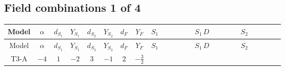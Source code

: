 \documentclass[8pt]{article}
\begin{document}
\begin{landscape}
\subsection*{Field combinations 1 of 4}
\begin{longtable}{@{}cccccccc >{\raggedright\arraybackslash}p{0.21\linewidth} >{\raggedright\arraybackslash}p{0.21\linewidth} >{\raggedright\arraybackslash}p{0.21\linewidth}@{}}
\toprule
Model & $\alpha$ & $d_{S_1}$ & $Y_{S_1}$ & $d_{S_2}$ & $Y_{S_2}$ & $d_F$ & $Y_F$ & $S_1$ & $S_1\,D$ & $S_2$ \\
\midrule
\endfirsthead
\toprule
Model & $\alpha$ & $d_{S_1}$ & $Y_{S_1}$ & $d_{S_2}$ & $Y_{S_2}$ & $d_F$ & $Y_F$ & $S_1$ & $S_1\,D$ & $S_2$ \\
\midrule
\endhead
T3-A & $-4$ & $1$ & $-2$ & $3$ & $-1$ & $2$ & $-\frac{3}{2}$ & \scriptsize\adjustbox{max width=\linewidth}{$\begin{gathered} -S_1 S_1{}^{\dagger } m_1^2 \\ +\frac{1}{2} S_1^2 \left(S_1{}^{\dagger }\right){}^2 \lambda_{S_1}^{(1)}^{(1)}\end{gathered}$} & \scriptsize\adjustbox{max width=\linewidth}{$\begin{gathered} +D_{\mu _1}\left(S_1\right){}^{\dagger } D_{\mu _1}\left(S_1\right)\end{gathered}$} & \scriptsize\adjustbox{max width=\linewidth}{$\begin{gathered} -m_2^2 S_{2,j_1} S_{2,j_1}{}^{\dagger } \\ +\frac{1}{2} S_{2,j_3} S_{2,j_4} S_{2,j_1}{}^{\dagger } S_{2,j_2}{}^{\dagger } \mathcal{I}_{S_2,j_1,j_3,j_2,j_4}{}^1 \lambda_{S_2}^{(1)}^{(1)} \\ +\frac{1}{2} S_{2,j_3} S_{2,j_4} S_{2,j_1}{}^{\dagger } S_{2,j_2}{}^{\dagger } \mathcal{I}_{S_2,j_1,j_3,j_2,j_4}{}^2 \lambda_{S_2}^{(1)}^{(2)}\end{gathered}$} \\
\midrule
\bottomrule
\end{longtable}
\clearpage

\end{landscape}
\end{document}
